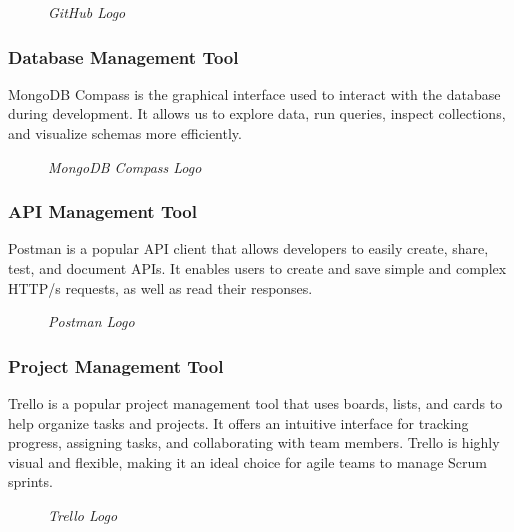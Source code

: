 \begin{figure}[H]
	\centering
	\caption{\textit{GitHub Logo}}
\end{figure}

\subsubsection{Database Management Tool}
MongoDB Compass is the graphical interface used to interact with the database during development. It allows us to explore data, run queries, inspect collections, and visualize schemas more efficiently.

\begin{figure}[H]
	\centering
	\caption{\textit{MongoDB Compass Logo}}
\end{figure}

\subsubsection{API Management Tool}
Postman is a popular API client that allows developers to easily create, share, test, and document APIs. It enables users to create and save simple and complex HTTP/s requests, as well as read their responses.

\begin{figure}[H]
	\centering
	\caption{\textit{Postman Logo}}
\end{figure}

\subsubsection{Project Management Tool}
Trello is a popular project management tool that uses boards, lists, and cards to help organize tasks and projects. It offers an intuitive interface for tracking progress, assigning tasks, and collaborating with team members. Trello is highly visual and flexible, making it an ideal choice for agile teams to manage Scrum sprints.

\begin{figure}[H]
	\centering
	\caption{\textit{Trello Logo}}
\end{figure}

